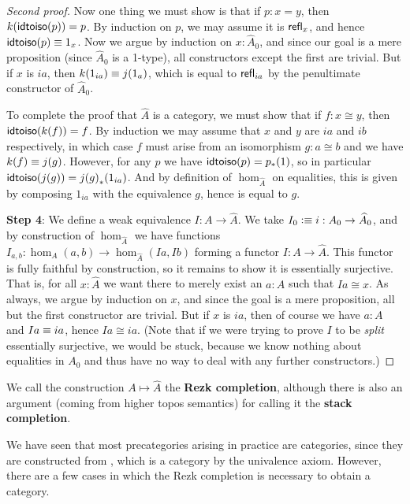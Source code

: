 \begin{proof}[Second proof]
  Now one thing we must show is that if $p:x=y$, then $k(\mathsf{idtoiso}(p))=p$.
  By induction on $p$, we may assume it is $\mathsf{refl}_{x}$, and hence $\mathsf{idtoiso}(p)\equiv 1_x$.
  Now we argue by induction on $x:\widehat A_0$, and since our goal is a mere proposition (since $\widehat A_0$ is a 1-type), all constructors except the first are trivial.
  But if $x$ is $ia$, then $k(1_{ia}) \equiv j(1_a)$, which is equal to $\mathsf{refl}_{ia}$ by the penultimate constructor of $\widehat A_0$.

  To complete the proof that $\widehat A$ is a category, we must show that if $f:x\cong y$, then $\mathsf{idtoiso}(k(f))=f$.
  By induction we may assume that $x$ and $y$ are $ia$ and $ib$ respectively, in which case $f$ must arise from an isomorphism $g:a\cong b$ and we have $k(f)\equiv j(g)$.
  However, for any $p$ we have $\mathsf{idtoiso}(p) = {p}_{*}\!\left({1}\right)$, so in particular $\mathsf{idtoiso} (j(g)) = {j(g)}_{*}\!\left({1_{ia}}\right)$.
  And by definition of $\hom_{\widehat A}$ on equalities, this is given by composing $1_{ia}$ with the equivalence $g$, hence is equal to $g$.

  \medskip

  \textbf{Step 4}: We define a weak equivalence $I:A \to \widehat A$.
  We take $I_0 \vcentcolon\equiv i : A_0 \to \widehat A_0$, and by construction of $\hom_{\widehat A}$ we have functions $I_{a,b}:\hom_A(a,b) \to \hom_{\widehat A}(Ia,Ib)$ forming a functor $I:A \to \widehat A$.
  This functor is fully faithful by construction, so it remains to show it is essentially surjective.
  That is, for all $x:\widehat A$ we want there to merely exist an $a:A$ such that $Ia\cong x$.
  As always, we argue by induction on $x$, and since the goal is a mere proposition, all but the first constructor are trivial.
  But if $x$ is $ia$, then of course we have $a:A$ and $Ia\equiv ia$, hence $Ia \cong ia$.
  (Note that if we were trying to prove $I$ to be \emph{split} essentially surjective, we would be stuck, because we know nothing about equalities in $A_0$ and thus have no way to deal with any further constructors.)
\end{proof}

We call the construction $A\mapsto \widehat A$ the \textbf{Rezk completion}, although there is also an argument (coming from higher topos semantics) for calling it the \textbf{stack completion}.

We have seen that most precategories arising in practice are categories, since they are constructed from \uset, which is a category by the univalence axiom.
However, there are a few cases in which the Rezk completion is necessary to obtain a category.

